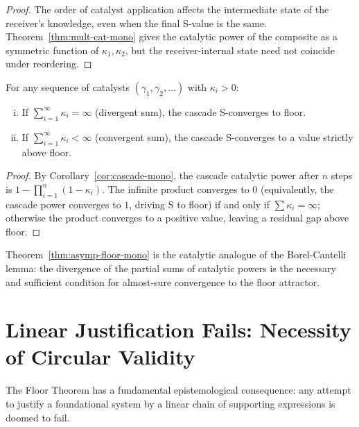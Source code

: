 \begin{proof}
The order of catalyst application affects the intermediate state of the
receiver's knowledge, even when the final S-value is the same.
Theorem~\ref{thm:mult-cat-mono} gives the catalytic power of the composite as
a symmetric function of $\kappa_1, \kappa_2$, but the receiver-internal state
need not coincide under reordering.
\end{proof}

\begin{theorem}\label{thm:asymp-floor-mono}
For any sequence of catalysts $(\gamma_1, \gamma_2, \ldots)$ with
$\kappa_i > 0$:
\begin{enumerate}[(i)]
  \item If $\sum_{i=1}^{\infty} \kappa_i = \infty$ (divergent sum), the cascade
    S-converges to floor.
  \item If $\sum_{i=1}^{\infty} \kappa_i < \infty$ (convergent sum), the cascade
    S-converges to a value strictly above floor.
\end{enumerate}
\end{theorem}

\begin{proof}
By Corollary~\ref{cor:cascade-mono}, the cascade catalytic power after $n$
steps is $1 - \prod_{i=1}^{n}(1 - \kappa_i)$.  The infinite product converges
to $0$ (equivalently, the cascade power converges to $1$, driving S to floor)
if and only if $\sum \kappa_i = \infty$; otherwise the product converges to a
positive value, leaving a residual gap above floor.
\end{proof}

\begin{remark}
Theorem~\ref{thm:asymp-floor-mono} is the catalytic analogue of the
Borel-Cantelli lemma: the divergence of the partial sums of catalytic powers
is the necessary and sufficient condition for almost-sure convergence to the
floor attractor.
\end{remark}

\section{Linear Justification Fails: Necessity of Circular Validity}
\label{sec:ch14-circular}

The Floor Theorem has a fundamental epistemological consequence: any
attempt to justify a foundational system by a linear chain of supporting
expressions is doomed to fail.

